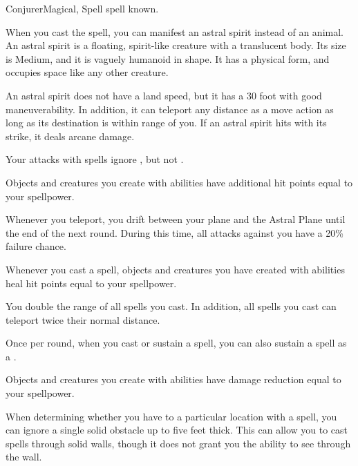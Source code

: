     \begin{feat}{Conjurer}{Magical, Spell}
        \featpre {} spell known.
        \featben

         When you cast the  spell, you can manifest an astral spirit instead of an animal.
        An astral spirit is a floating, spirit-like creature with a translucent body.
        Its size is Medium, and it is vaguely humanoid in shape.
        It has a physical form, and occupies space like any other creature.

        An astral spirit does not have a land speed, but it has a 30 foot  with good maneuverability.
        In addition, it can teleport any distance as a move action as long as its destination is within \rngmed range of you.
        If an astral spirit hits with its strike, it deals arcane damage.

         Your attacks with spells ignore , but not .

         Objects and creatures you create with  abilities have additional hit points equal to your spellpower.

         Whenever you teleport, you drift between your plane and the Astral Plane until the end of the next round.
        During this time, all attacks against you have a 20\% failure chance.

         Whenever you cast a spell, objects and creatures you have created with  abilities heal hit points equal to your spellpower.

         You double the range of all spells you cast.
        In addition, all  spells you cast can teleport twice their normal distance.

         Once per round, when you cast or sustain a spell, you can also sustain a  spell as a .

         Objects and creatures you create with  abilities have damage reduction equal to your spellpower.

         When determining whether you have  to a particular location with a spell, you can ignore a single solid obstacle up to five feet thick.
        This can allow you to cast spells through solid walls, though it does not grant you the ability to see through the wall.


\end{feat}
